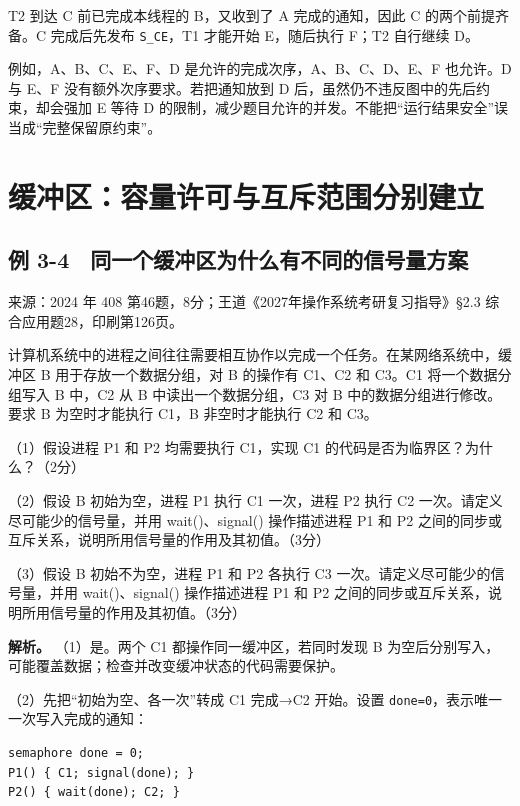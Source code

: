 T2 到达 C 前已完成本线程的 B，又收到了 A 完成的通知，因此 C 的两个前提齐备。C 完成后先发布 \texttt{S\_CE}，T1 才能开始 E，随后执行 F；T2 自行继续 D。

例如，A、B、C、E、F、D 是允许的完成次序，A、B、C、D、E、F 也允许。D 与 E、F 没有额外次序要求。若把通知放到 D 后，虽然仍不违反图中的先后约束，却会强加 E 等待 D 的限制，减少题目允许的并发。不能把``运行结果安全''误当成``完整保留原约束''。

\section{缓冲区：容量许可与互斥范围分别建立}\label{sec-buffer}

\subsection{例 3-4　同一个缓冲区为什么有不同的信号量方案}\label{ex-2024}

来源：2024 年 408 第46题，8分；王道《2027年操作系统考研复习指导》§2.3 综合应用题28，印刷第126页。

计算机系统中的进程之间往往需要相互协作以完成一个任务。在某网络系统中，缓冲区 B 用于存放一个数据分组，对 B 的操作有 C1、C2 和 C3。C1 将一个数据分组写入 B 中，C2 从 B 中读出一个数据分组，C3 对 B 中的数据分组进行修改。要求 B 为空时才能执行 C1，B 非空时才能执行 C2 和 C3。

（1）假设进程 P1 和 P2 均需要执行 C1，实现 C1 的代码是否为临界区？为什么？（2分）

（2）假设 B 初始为空，进程 P1 执行 C1 一次，进程 P2 执行 C2 一次。请定义尽可能少的信号量，并用 wait()、signal() 操作描述进程 P1 和 P2 之间的同步或互斥关系，说明所用信号量的作用及其初值。（3分）

（3）假设 B 初始不为空，进程 P1 和 P2 各执行 C3 一次。请定义尽可能少的信号量，并用 wait()、signal() 操作描述进程 P1 和 P2 之间的同步或互斥关系，说明所用信号量的作用及其初值。（3分）


\textbf{解析。} （1）是。两个 C1 都操作同一缓冲区，若同时发现 B 为空后分别写入，可能覆盖数据；检查并改变缓冲状态的代码需要保护。

（2）先把``初始为空、各一次''转成 C1 完成→C2 开始。设置 \texttt{done=0}，表示唯一一次写入完成的通知：

\par\medskip\noindent\begin{minipage}{\linewidth}
\begin{verbatim}
semaphore done = 0;
P1() { C1; signal(done); }
P2() { wait(done); C2; }
\end{verbatim}
\end{minipage}\par\medskip

